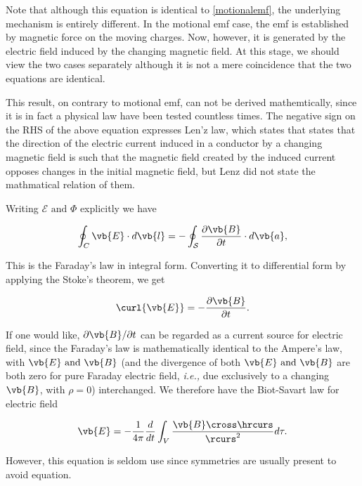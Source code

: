 \documentclass[english,a4paper,12pt]{report}
\begin{document}
Note that although this equation is identical to \cref{motionalemf}, the underlying mechanism is entirely different. In the motional emf case, the emf is established by magnetic force on the moving charges. Now, however, it is generated by the electric field induced by the changing magnetic field. At this stage, we should view the two cases separately although it is not a mere coincidence that the two equations are identical.

This result, on contrary to motional emf, can not be derived mathemtically, since it is in fact a physical law have been tested countless times. The negative sign on the RHS of the above equation expresses Len'z law, which states that states that the direction of the electric current induced in a conductor by a changing magnetic field is such that the magnetic field created by the induced current opposes changes in the initial magnetic field, but Lenz did not state the mathmatical relation of them. 

Writing \(\mathcal{E}\text { and } \Phi \) explicitly we have

\begin{equation}
    \oint_{C}\vb{E}  \cdot d \vb{l} = -\oint_{\mathcal{S}} \frac{\partial \vb{B} }{\partial t}\cdot d \vb{a} ,  
\end{equation}

This is the Faraday's law in integral form. Converting it to differential form by applying the Stoke's theorem, we get

\begin{equation}
    \curl{\vb{E} } = -\frac{\partial \vb{B} }{\partial t}.  
\end{equation}

If one would like, \(\partial \vb{B} /\partial t\) can be regarded as a current source for electric field, since the Faraday's law is mathematically identical to the Ampere's law, with \(\vb{E} \text { and } \vb{B} \) (and the divergence of both \(\vb{E} \text { and } \vb{B} \) are both zero for pure Faraday electric field, \textit{i.e.,} due exclusively to a changing \(\vb{B} \), with \(\rho =0\)) interchanged. We therefore have the Biot-Savart law for electric field 

\begin{equation}
    \vb{E} = -\frac{1}{4\pi } \frac{d}{dt} \int_{V}^{} \frac{\vb{B} \cross \hrcurs }{\rcurs ^2} d\tau .  
\end{equation}

However, this equation is seldom use since symmetries are usually present to avoid equation.
\end{document}
